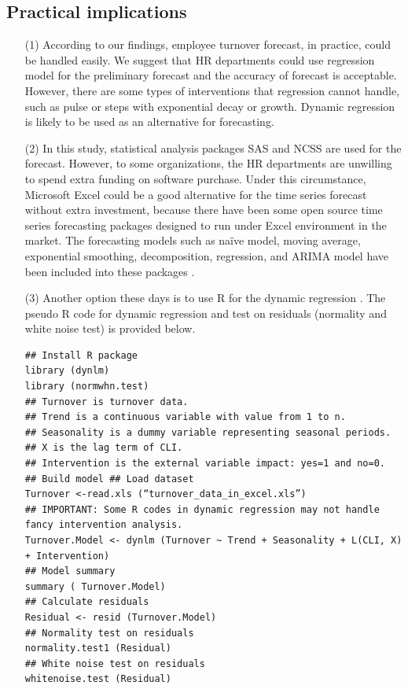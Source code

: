 \subsection{Practical implications}
\begin{itemize}
\item[(1)]	According to our findings, employee turnover forecast, in practice, could be handled easily. We suggest that HR departments could use regression model for the preliminary forecast and the accuracy of forecast is acceptable. However, there are some types of interventions that regression cannot handle, such as pulse or steps with exponential decay or growth. Dynamic regression is likely to be used as an alternative for forecasting.
\item[(2)] In this study, statistical analysis packages SAS and NCSS are used for the forecast. However, to some organizations, the HR departments are unwilling to spend extra funding on software purchase. Under this circumstance, Microsoft Excel could be a good alternative for the time series forecast without extra investment, because there have been some open source time series forecasting packages designed to run under Excel environment in the market. The forecasting models such as naïve model, moving average, exponential smoothing, decomposition, regression, and ARIMA model have been included into these packages \citep{warren2008}.
\item[(3)]	Another option these days is to use R for the dynamic regression \citep{hyndman2014}. The pseudo R code for dynamic regression and test on residuals (normality and white noise test) is provided below. 
\begin{lstlisting}
## Install R package
library (dynlm)
library (normwhn.test)
## Turnover is turnover data.  
## Trend is a continuous variable with value from 1 to n. 
## Seasonality is a dummy variable representing seasonal periods. 
## X is the lag term of CLI.
## Intervention is the external variable impact: yes=1 and no=0.
## Build model ## Load dataset
Turnover <-read.xls (“turnover_data_in_excel.xls”)
## IMPORTANT: Some R codes in dynamic regression may not handle fancy intervention analysis.
Turnover.Model <- dynlm (Turnover ~ Trend + Seasonality + L(CLI, X) + Intervention) 
## Model summary
summary ( Turnover.Model)
## Calculate residuals
Residual <- resid (Turnover.Model)
## Normality test on residuals
normality.test1 (Residual)
## White noise test on residuals
whitenoise.test (Residual)
\end{lstlisting}
\end{itemize}
